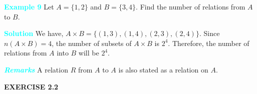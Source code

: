 \documentclass[11pt]{article}
\begin{document}
\vspace{0.75cm}
\noindent\textcolor{cyan}{\textbf{Example 9}}
Let $A = \{1, 2\}$ and $B = \{3, 4\}$. Find the number of relations from $A$ to $B$.

\noindent\textcolor{cyan}{\textbf{Solution}} We have,
$A \times B = \{(1, 3), (1, 4), (2, 3), (2, 4)\}.$
\noindent Since $n(A \times B) = 4$, the number of subsets of $A \times B$ is $2^4$. Therefore, the number of relations from $A$ into $B$ will be $2^4$.
\noindent
\begin{minipage}[t]{\linewidth}
\colorbox{ncertblue}{\textcolor{cyan}{\textbf{\textit{Remarks}}}}
 A relation $R$ from $A$ to $A$ is also stated as a relation on $A$.
\end{minipage}
\begin{center}
\begin{tcolorbox}[
  enhanced,
  width=0.25\textwidth,  
  colframe=cyan!80!black,
  boxrule=1.2pt,
  arc=0mm,                
  left=10pt,
  right=10pt,
  top=8pt,
  bottom=8pt
]
\centering
\textbf{\textcolor{cyan!80!black}{EXERCISE 2.2}}
\end{tcolorbox}
\end{center}
\end{document}
